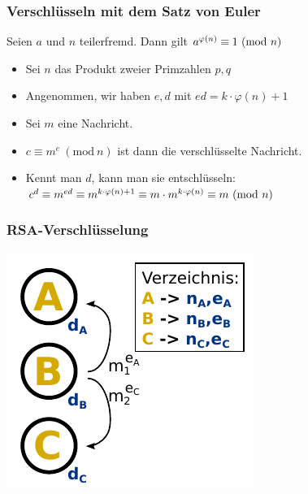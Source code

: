 \documentclass{beamer}
\begin{document}
\begin{frame}
\frametitle{Verschlüsseln mit dem Satz von Euler}

	\begin{theorem}
		Seien \(a\) und \(n\) teilerfremd.
		Dann gilt \(a^{\varphi(n)} \equiv 1 \ (\textnormal{mod}\ n)\)
	\end{theorem}

	\begin{itemize}
		\item Sei \(n\) das Produkt zweier Primzahlen \(p,q\)
		\item Angenommen, wir haben \(e,d\) mit \(ed = k \cdot \varphi(n) + 1\)
\pause		\item Sei \(m\) eine Nachricht.
		\item \(c \equiv m^e \ (\text{mod}\ n)\) ist dann die verschlüsselte Nachricht.
\pause		\item Kennt man \(d\), kann man sie entschlüsseln: \(c^d \equiv m^{ed} \equiv m^{k \cdot \varphi(n) + 1} \equiv m \cdot m^{k \cdot \varphi(n)} \equiv m \ (\textnormal{mod}\ n)\)
	\end{itemize}
\end{frame}

\begin{frame}
\frametitle{RSA-Verschlüsselung}

	\begin{center}
	\includegraphics[height=0.8\textheight]{images/rsa.pdf}
	\end{center}
\end{frame}
\end{document}
